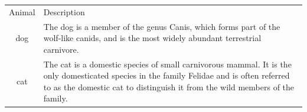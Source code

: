 \documentclass{article}
\begin{document}
	\begin{tabular}{cp{9cm}}
		Animal & Description \\
		dog & The dog is a member of the genus Canis, which forms part of the wolf-like canids, and is the most widely abundant terrestrial carnivore. \\
		cat & The cat is a domestic species of small carnivorous mammal. It is the only domesticated species in the family Felidae and is often referred to as the domestic cat to distinguish it from the wild members of the family. \\
	\end{tabular}
\end{document}
